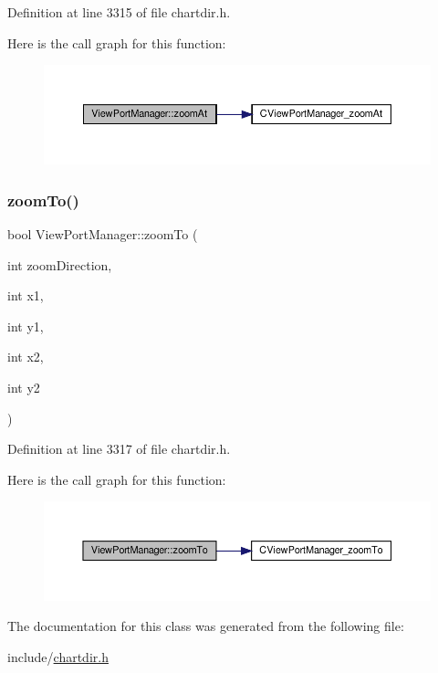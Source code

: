Definition at line 3315 of file chartdir.\+h.

Here is the call graph for this function\+:
\nopagebreak
\begin{figure}[H]
\begin{center}
\leavevmode
\includegraphics[width=350pt]{class_view_port_manager_a91160303aebb6d58369175131022b3e6_cgraph}
\end{center}
\end{figure}
\mbox{\label{class_view_port_manager_a50b30e900b4ca55321fb6d8cac99e2ee}} 
\subsubsection{\texorpdfstring{zoom\+To()}{zoomTo()}}
{\footnotesize\ttfamily bool View\+Port\+Manager\+::zoom\+To (\begin{DoxyParamCaption}\item[{int}]{zoom\+Direction,  }\item[{int}]{x1,  }\item[{int}]{y1,  }\item[{int}]{x2,  }\item[{int}]{y2 }\end{DoxyParamCaption})\hspace{0.3cm}{\ttfamily [inline]}}



Definition at line 3317 of file chartdir.\+h.

Here is the call graph for this function\+:
\nopagebreak
\begin{figure}[H]
\begin{center}
\leavevmode
\includegraphics[width=350pt]{class_view_port_manager_a50b30e900b4ca55321fb6d8cac99e2ee_cgraph}
\end{center}
\end{figure}


The documentation for this class was generated from the following file\+:\begin{DoxyCompactItemize}
\item 
include/\hyperlink{chartdir_8h}{chartdir.\+h}\end{DoxyCompactItemize}
